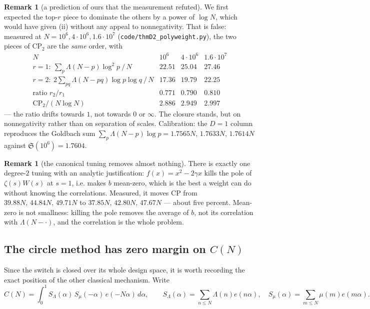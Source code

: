 \documentclass[11pt,a4paper]{article}
\theoremstyle{plain}
\theoremstyle{definition}
\newtheorem{remark}[theorem]{Remark}
\renewcommand{\SS}{\mathfrak{S}}
\begin{document}
\begin{remark}[a prediction of ours that the measurement refuted]
We first expected the top-$r$ piece to dominate the others by a power
of $\log N$, which would have given (ii) without any appeal to
nonnegativity. That is false: measured at $N = 10^6, 4\cdot10^6,
1.6\cdot10^7$ (\texttt{code/thmD2\_polyweight.py}), the two pieces of
$\mathrm{CP}_2$ are the \emph{same} order, with
\[
\begin{array}{r|ccc}
 N & 10^6 & 4\cdot10^6 & 1.6\cdot10^7\\\hline
 r=1:\ \sum_p\Lambda(N-p)\log^2p\ /\,N & 22.51 & 25.04 & 27.46\\
 r=2:\ 2\sum_{pq}\Lambda(N-pq)\log p\log q\ /\,N & 17.36 & 19.79 & 22.25\\
 \text{ratio } r_2/r_1 & 0.771 & 0.790 & 0.810\\
 \mathrm{CP}_2/(N\log N) & 2.886 & 2.949 & 2.997
\end{array}
\]
--- the ratio drifts towards $1$, not towards $0$ or $\infty$. The
closure stands, but on nonnegativity rather than on separation of
scales. Calibration: the $D=1$ column reproduces the Goldbach sum
$\sum_p\Lambda(N-p)\log p = 1.7565N,\,1.7633N,\,1.7614N$ against
$\SS(10^6)=1.7604$.
\end{remark}

\begin{remark}[the canonical tuning removes almost nothing]
There is exactly one degree-$2$ tuning with an analytic justification:
$f(x)=x^2-2\gamma x$ kills the pole of $\zeta(s)W(s)$ at $s=1$, i.e.
makes $b$ mean-zero, which is the best a weight can do without knowing
the correlations. Measured, it moves $\mathrm{CP}$ from
$39.88N,\,44.84N,\,49.71N$ to $37.85N,\,42.80N,\,47.67N$ --- about
five percent. Mean-zero is not smallness: killing the pole removes the
average of $b$, not its correlation with $\Lambda(N-\cdot)$, and the
correlation is the whole problem.
\end{remark}

\subsection{The circle method has zero margin on $C(N)$}
\label{sec:circle}

Since the switch is closed over its whole design space, it is worth
recording the exact position of the other classical mechanism. Write
\[
  C(N) = \int_0^1 S_\Lambda(\alpha)\,S_\mu(-\alpha)\,e(-N\alpha)\,
   d\alpha,\qquad
  S_\Lambda(\alpha)=\sum_{n\le N}\Lambda(n)e(n\alpha),\quad
  S_\mu(\alpha)=\sum_{m\le N}\mu(m)e(m\alpha).
\]
\end{document}
